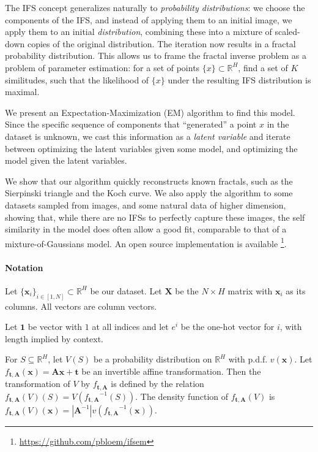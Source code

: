 \documentclass[reprint,amsmath,amssymb,aps,prl]{revtex4-1}
\newcommand{\R}{\mathbb{R}}
\newcommand{\bx}{\boldsymbol x}
\newcommand{\bX}{\boldsymbol X}
\newcommand{\bo}{\boldsymbol 1}
\newcommand{\bt}{\boldsymbol t}
\newcommand{\bA}{\boldsymbol A}
\begin{document}
The IFS concept generalizes naturally to \emph{probability distributions}: we choose the components of the IFS, and instead of applying them to an initial image, we apply them to an initial \emph{distribution}, combining these into a mixture of scaled-down copies of the original distribution. The iteration now results in a fractal probability distribution. This allows us to frame the fractal inverse problem as a problem of parameter estimation: for a set of points $\{x\} \subset \R^H$, find a set of $K$ similitudes, such that the likelihood of $\{x\}$ under the resulting IFS distribution is maximal. 

We present an Expectation-Maximization (EM) algorithm \cite{dempster1977maximum} to find this model. Since the specific sequence of components that ``generated'' a point $x$ in the dataset is unknown, we cast this information as a \emph{latent variable} and iterate between optimizing the latent variables given some model, and optimizing the model given the latent variables. 

We show that our algorithm quickly reconstructs known fractals, such as the Sierpinski triangle and the Koch curve. We also apply the algorithm to some datasets sampled from images, and some natural data of higher dimension, showing that, while there are no IFSs to perfectly capture these images, the self similarity in the model does often allow a good fit, comparable to that of a mixture-of-Gaussians model. An open source implementation is available \footnote{\url{https://github.com/pbloem/ifsem}}.

\paragraph{Notation} 

Let $\{\bx_i\}_{i\in[1,N]} \subset \R^H$ be our dataset. Let $\bX$ be the $N\times H$ matrix with $\bx_i$ as its columns. All vectors are column vectors.  

Let $\bo$ be vector with $1$ at all indices and let $e^i$ be the one-hot vector for $i$, with length implied by context.

For $S \subseteq \R^H$, let $V(S)$ be a probability distribution on $\R^H$ with p.d.f. $v(\bx)$. Let $f_{\bt, \bA}(\bx) = \bA\bx + \bt$ be an invertible affine transformation. Then the transformation of $V$ by $f_{\bt, \bA}$ is defined by the relation $f_{\bt, \bA}(V)(S) = V({f_{\bt, \bA}}^{-1}(S))$. The density function of $f_{\bt, \bA}(V)$ is $f_{\bt, \bA}(V)(\bx) = |\bA^{-1}| v({f_{\bt, \bA}}^{-1}(\bx))$.
\end{document}
